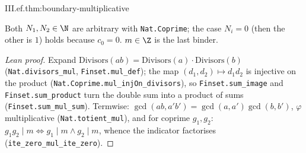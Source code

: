 \begin{theorem}
\end{theorem}
\begin{tfformal}{III.ef.thm:boundary-multiplicative}
\begin{tffidelity}
Both $N_1,N_2\in\N$ are arbitrary with \texttt{Nat.Coprime}; the case $N_i=0$ (then the other is $1$) holds because $c_0=0$. $m\in\Z$ is the last binder.
\end{tffidelity}
\end{tfformal}
\begin{proof}[Lean proof]
Expand $\mathrm{Divisors}(ab)=\mathrm{Divisors}(a)\cdot\mathrm{Divisors}(b)$ (\texttt{Nat.divisors\_mul}, \texttt{Finset.mul\_def}); the map $(d_1,d_2)\mapsto d_1d_2$ is injective on the product (\texttt{Nat.Coprime.mul\_injOn\_divisors}), so \texttt{Finset.sum\_image} and \texttt{Finset.sum\_product} turn the double sum into a product of sums (\texttt{Finset.sum\_mul\_sum}). Termwise: $\gcd(ab,a'b')=\gcd(a,a')\gcd(b,b')$, $\varphi$ multiplicative (\texttt{Nat.totient\_mul}), and for coprime $g_1,g_2$: $g_1g_2\mid m\iff g_1\mid m\wedge g_2\mid m$, whence the indicator factorises (\texttt{ite\_zero\_mul\_ite\_zero}).
\end{proof}

